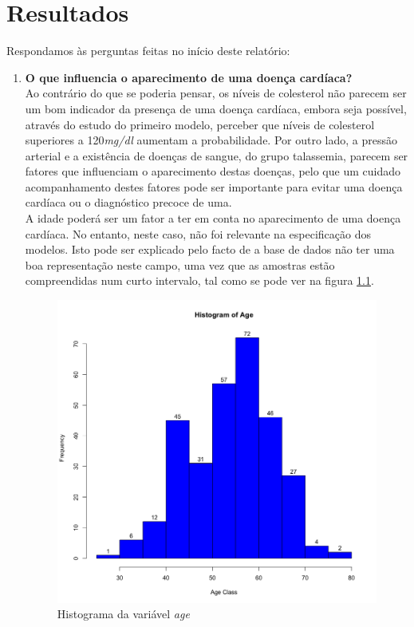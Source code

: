 \documentclass[a4paper]{report}
\begin{document}
\chapter{Resultados}
\large{
	Respondamos às perguntas feitas no início deste relatório:
	\begin{enumerate}
		\item \textbf{O que influencia o aparecimento de uma doença cardíaca?} \\
		Ao contrário do que se poderia pensar, os níveis de colesterol não parecem ser um bom indicador da presença de uma doença cardíaca, embora seja possível, 
		através do estudo do primeiro modelo, perceber que níveis de colesterol superiores a 120\textit{mg/dl} aumentam a probabilidade.
		Por outro lado, a pressão arterial e a existência de doenças de sangue, do grupo talassemia, parecem ser fatores que influenciam o aparecimento destas doenças, 
		pelo que um cuidado acompanhamento destes fatores pode ser importante para evitar uma doença cardíaca ou o diagnóstico precoce de uma. \\

		A idade poderá ser um fator a ter em conta no aparecimento de uma doença cardíaca. No entanto, neste caso, não foi relevante na especificação dos modelos.
		Isto pode ser explicado pelo facto de a base de dados não ter uma boa representação neste campo, uma vez que as amostras estão compreendidas num curto intervalo, tal 
		como se pode ver na figura \ref{fig:histogram}.

		\begin{figure}[h!]
			\centering
			\includegraphics[scale=0.4]{images/histogram.png}
			\caption{Histograma da variável \textit{age}}
			\label{fig:histogram}
		\end{figure}


\end{enumerate}}
\end{document}
